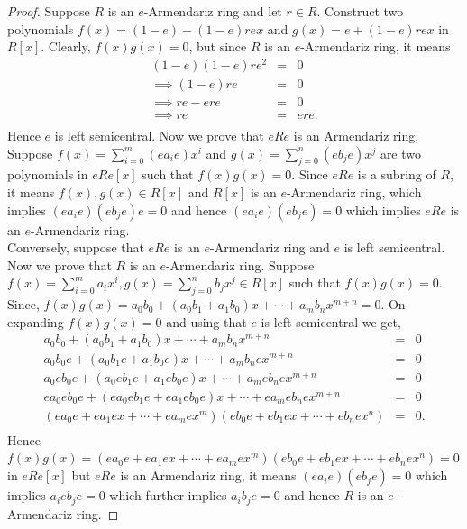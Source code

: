 \documentclass[10pt,a4paper]{amsart}
\numberwithin{equation}{section}
\begin{document}
\begin{proof}
	Suppose $R$ is an $e$-Armendariz ring and let $r\in R$. Construct two polynomials $f(x)=(1-e)-(1-e)rex$ and $g(x)=e+(1-e)rex$ in $R[x]$. Clearly, $f(x)g(x)=0$, but since $R$ is an $e$-Armendariz ring, it means 
	\begin{eqnarray*}
		(1-e)(1-e)re^2&=&0\\
		\implies (1-e)re&=&0\\
		\implies re-ere&=&0\\
		\implies re&=&ere.\\	
	\end{eqnarray*}
	Hence $e$ is left semicentral. Now we prove that $eRe$ is an Armendariz ring. Suppose $f(x)=\sum_{i=0}^{m}(ea_ie)x^i$ and $g(x)=\sum_{j=0}^{n}(eb_je)x^j$ are two polynomials in $eRe[x]$ such that $f(x)g(x)=0$. Since $eRe$ is a subring of $R$, it means $f(x),g(x)\in R[x]$ and $R[x]$ is an $e$-Armendariz ring, which implies $(ea_ie)(eb_je)e=0$ and hence $(ea_ie)(eb_je)=0$ which implies $eRe$ is an $e$-Armendariz ring.\\
	Conversely, suppose that $eRe$ is an $e$-Armendariz ring and $e$ is left semicentral. Now we prove that $R$ is an $e$-Armendariz ring. Suppose $f(x)=\sum_{i=0}^{m}a_ix^i, g(x)=\sum_{j=0}^{n}b_jx^j\in R[x]$ such that $f(x)g(x)=0$. Since, $f(x)g(x)=a_0b_0+(a_0b_1+a_1b_0)x+\cdots+a_mb_nx^{m+n}=0.$ On expanding $f(x)g(x)=0$ and using that $e$ is left semicentral we get,
	\begin{eqnarray*}
	a_0b_0+(a_0b_1+a_1b_0)x+\cdots+a_mb_nx^{m+n}&=&0\\
	a_0b_0e+(a_0b_1e+a_1b_0e)x+\cdots+a_mb_nex^{m+n}&=&0\\
	a_0eb_0e+(a_0eb_1e+a_1eb_0e)x+\cdots+a_meb_nex^{m+n}&=&0\\
	ea_0eb_0e+(ea_0eb_1e+ea_1eb_0e)x+\cdots+ea_meb_nex^{m+n}&=&0\\
	(ea_0e+ea_1ex+\cdots+ea_mex^m)(eb_0e+eb_1ex+\cdots+eb_nex^n)&=&0.\\
	\end{eqnarray*}
	Hence $f(x)g(x)=(ea_0e+ea_1ex+\cdots+ea_mex^m)(eb_0e+eb_1ex+\cdots+eb_nex^n)=0$ in $eRe[x]$ but $eRe$ is an Armendariz ring, it means $(ea_ie)(eb_je)=0$ which implies $a_ieb_je=0$ which further implies $a_ib_je=0$ and hence $R$ is an $e$-Armendariz ring.
\end{proof}
\end{document}
